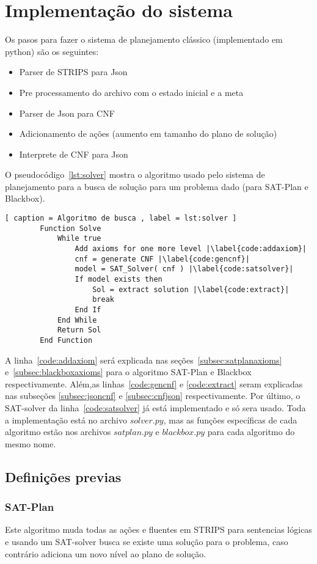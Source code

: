 \section{Implementação do sistema}
\label{sec:implementacao}

Os pasos para fazer o sistema de planejamento clássico (implementado em python) são os seguintes:
	\begin{itemize}
		\item Parser de STRIPS para Json
		\item Pre processamento do archivo com o estado inicial e a meta
		\item Parser de Json para CNF
		\item Adicionamento de ações (aumento em tamanho do plano de solução)
		\item Interprete de CNF para Json
	\end{itemize}
O pseudocódigo~\ref{lst:solver} mostra o algoritmo usado pelo sistema de planejamento para a busca de solução para um problema dado (para SAT-Plan e Blackbox).
	\renewcommand \lstlistingname{Pseudocódigo}
	\begin{lstlisting}[ caption = Algoritmo de busca , label = lst:solver ]
		Function Solve
			While true
				Add axioms for one more level |\label{code:addaxiom}|
				cnf = generate CNF |\label{code:gencnf}|
				model = SAT_Solver( cnf ) |\label{code:satsolver}|
				If model exists then
					Sol = extract solution |\label{code:extract}|
					break
				End If
			End While
			Return Sol
		End Function
	\end{lstlisting}
A linha~\ref{code:addaxiom} será explicada nas seções~\ref{subsec:satplanaxioms} e~\ref{subsec:blackboxaxioms} para o algoritmo SAT-Plan e Blackbox respectivamente. Além,as linhas~\ref{code:gencnf} e \ref{code:extract} seram explicadas nas subseções \ref{subsec:jsoncnf} e \ref{subsec:cnfjson} respectivamente. Por último, o SAT-solver da linha~\ref{code:satsolver} já está implementado e só sera usado. Toda a implementação está no archivo ${solver.py}$, mas as funções específicas de cada algoritmo estão nos archivos ${satplan.py}$ e ${blackbox.py}$ para cada algoritmo do mesmo nome.

\subsection{Definições previas}
	\subsubsection{SAT-Plan}
	\label{subsub:satplan}
		Este algoritmo muda todas as ações e fluentes em STRIPS para sentencias lógicas e usando um SAT-solver busca se existe uma solução para o problema, caso contrário adiciona um novo nível ao plano de solução.
	
